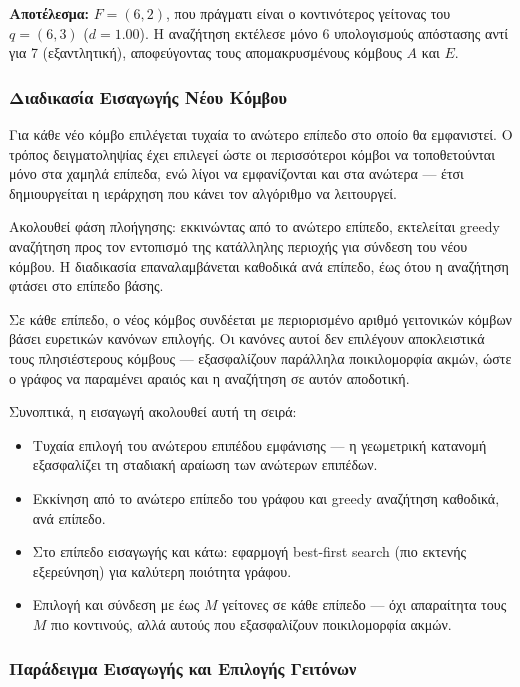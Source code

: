 \documentclass[12pt,a4paper]{article}
\begin{document}
\textbf{Αποτέλεσμα:} $F=(6,2)$, που πράγματι είναι ο κοντινότερος γείτονας του $q=(6,3)$ ($d=1.00$). Η αναζήτηση εκτέλεσε μόνο 6 υπολογισμούς απόστασης αντί για 7 (εξαντλητική), αποφεύγοντας τους απομακρυσμένους κόμβους $A$ και $E$.


\subsubsection{Διαδικασία Εισαγωγής Νέου Κόμβου}
Για κάθε νέο κόμβο επιλέγεται τυχαία το ανώτερο επίπεδο στο οποίο θα εμφανιστεί. Ο τρόπος δειγματοληψίας έχει επιλεγεί ώστε οι περισσότεροι κόμβοι να τοποθετούνται μόνο στα χαμηλά επίπεδα, ενώ λίγοι να εμφανίζονται και στα ανώτερα --- έτσι δημιουργείται η ιεράρχηση που κάνει τον αλγόριθμο να λειτουργεί.

Ακολουθεί φάση πλοήγησης: εκκινώντας από το ανώτερο επίπεδο, εκτελείται greedy αναζήτηση προς τον εντοπισμό της κατάλληλης περιοχής για σύνδεση του νέου κόμβου. Η διαδικασία επαναλαμβάνεται καθοδικά ανά επίπεδο, έως ότου η αναζήτηση φτάσει στο επίπεδο βάσης.

Σε κάθε επίπεδο, ο νέος κόμβος συνδέεται με περιορισμένο αριθμό γειτονικών κόμβων βάσει ευρετικών κανόνων επιλογής. Οι κανόνες αυτοί δεν επιλέγουν αποκλειστικά τους πλησιέστερους κόμβους --- εξασφαλίζουν παράλληλα ποικιλομορφία ακμών, ώστε ο γράφος να παραμένει αραιός και η αναζήτηση σε αυτόν αποδοτική.

Συνοπτικά, η εισαγωγή ακολουθεί αυτή τη σειρά:
\begin{itemize}
    \item Τυχαία επιλογή του ανώτερου επιπέδου εμφάνισης — η γεωμετρική κατανομή εξασφαλίζει τη σταδιακή αραίωση των ανώτερων επιπέδων.
    \item Εκκίνηση από το ανώτερο επίπεδο του γράφου και greedy αναζήτηση καθοδικά, ανά επίπεδο.
    \item Στο επίπεδο εισαγωγής και κάτω: εφαρμογή best-first search (πιο εκτενής εξερεύνηση) για καλύτερη ποιότητα γράφου.
    \item Επιλογή και σύνδεση με έως $M$ γείτονες σε κάθε επίπεδο — όχι απαραίτητα τους $M$ πιο κοντινούς, αλλά αυτούς που εξασφαλίζουν ποικιλομορφία ακμών.
\end{itemize}

\subsubsection{Παράδειγμα Εισαγωγής και Επιλογής Γειτόνων}
\end{document}
